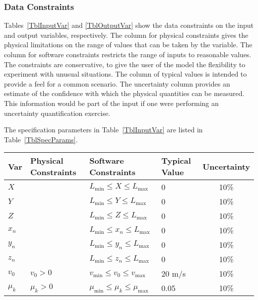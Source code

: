 \documentclass[12pt]{article}
\begin{document}
\subsubsection{Data Constraints} \label{sec_DataConstraints}    

Tables~\ref{TblInputVar} and \ref{TblOutputVar} show the data constraints on the
input and output variables, respectively.  The column for physical constraints gives
the physical limitations on the range of values that can be taken by the
variable.  The column for software constraints restricts the range of inputs to
reasonable values.  The constraints are conservative, to give the user of the
model the flexibility to experiment with unusual situations.  The column of
typical values is intended to provide a feel for a common scenario.  The
uncertainty column provides an estimate of the confidence with which the
physical quantities can be measured.  This information would be part of the
input if one were performing an uncertainty quantification exercise.

The specification parameters in Table~\ref{TblInputVar} are listed in
Table~\ref{TblSpecParams}.

\begin{table}[!h]
  \caption{Input Variables} \label{TblInputVar}
  \renewcommand{\arraystretch}{1.2}
\noindent \begin{longtable*}{l l l l c} 
  \toprule
  \textbf{Var} & \textbf{Physical Constraints} & \textbf{Software Constraints} &
                             \textbf{Typical Value} & \textbf{Uncertainty}\\
  \midrule 
  $X$ &  & $L_{\text{min}} \leq X \leq L_{\text{max}}$ & 0 & 10\%
  \\
  $Y$ &  & $L_{\text{min}} \leq Y \leq L_{\text{max}}$ & 0 & 10\%
  \\
  $Z$ &  & $L_{\text{min}} \leq Z \leq L_{\text{max}}$ & 0 & 10\%
  \\
  $x_{n}$ &  & $L_{\text{min}} \leq x_{n} \leq L_{\text{max}}$ & 0 & 10\%
  \\
  $y_{n}$ &  & $L_{\text{min}} \leq y_{n} \leq L_{\text{max}}$ & 0 & 10\%
  \\
  $z_{n}$ &  & $L_{\text{min}} \leq z_{n} \leq L_{\text{max}}$ & 0 & 10\%
  \\
  $v_{0}$ & $v_{0} > 0$ & $v_{\text{min}} \leq v_{0} \leq v_{\text{max}}$ & 20 m/s & 10\%
  \\
  $\mu_{k}$ & $\mu_{k} > 0$ & $\mu_{\text{min}} \leq \mu_{k} \leq \mu_{\text{max}}$ & 0.05 & 10\%
  \\
  \bottomrule
\end{longtable*}
\end{table}
\end{document}
